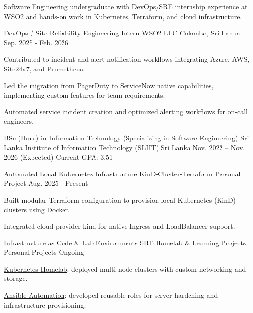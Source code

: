\begin{cvparagraph}
Software Engineering undergraduate with DevOps/SRE internship experience at WSO2
and hands-on work in Kubernetes, Terraform, and cloud infrastructure.
\end{cvparagraph}

\begin{cventries}
  \cventry
    {DevOps / Site Reliability Engineering Intern}
    {\href{https://wso2.com}{WSO2 LLC}}
    {Colombo, Sri Lanka}
    {Sep. 2025 - Feb. 2026}
    {
      \begin{cvitems}
        \item {Contributed to incident and alert notification workflows integrating
          Azure, AWS, Site24x7, and Prometheus.}
        \item {Led the migration from PagerDuty to ServiceNow native capabilities,
          implementing custom features for team requirements.}
        \item {Automated service incident creation and optimized alerting workflows
          for on-call engineers.}
      \end{cvitems}
    }
\end{cventries}

\begin{cventries}
  \cventry
    {BSc (Hons) in Information Technology (Specializing in Software Engineering)}
    {\href{https://www.sliit.lk}{Sri Lanka Institute of Information Technology (SLIIT)}}
    {Sri Lanka}
    {Nov. 2022 -- Nov. 2026 (Expected)}
    {Current GPA: 3.51}
\end{cventries}

\begin{cventries}
  \cventry
    {Automated Local Kubernetes Infrastructure}
    {\href{https://github.com/nmdra/kind-cluster-terraform}{KinD-Cluster-Terraform}}
    {Personal Project}
    {Aug. 2025 - Present}
    {
      \begin{cvitems}
        \item {Built modular Terraform configuration to provision local Kubernetes
          (KinD) clusters using Docker.}
        \item {Integrated cloud-provider-kind for native Ingress and LoadBalancer support.}
      \end{cvitems}
    }
  \cventry
    {Infrastructure as Code \& Lab Environments}
    {SRE Homelab \& Learning Projects}
    {Personal Projects}
    {Ongoing}
    {
      \begin{cvitems}
        \item {\href{https://github.com/nmdra/K8s-Learn}{Kubernetes Homelab}:
          deployed multi-node clusters with custom networking and storage.}
        \item {\href{https://github.com/nmdra/Ansible-Learn}{Ansible Automation}:
          developed reusable roles for server hardening and infrastructure provisioning.}
      \end{cvitems}
    }
\end{cventries}

